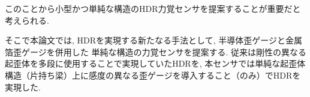 
このことから小型かつ単純な構造のHDR力覚センサを提案することが重要だと考えられる. 


そこで本論文では, HDRを実現する新たなる手法として, 半導体歪ゲージと金属箔歪ゲージを併用した
単純な構造の力覚センサを提案する. 
従来は剛性の異なる起歪体を多段に使用することで実現していたHDRを, 
本センサでは単純な起歪体構造（片持ち梁）上に感度の異なる歪ゲージを導入すること（のみ）でHDRを実現した. 

